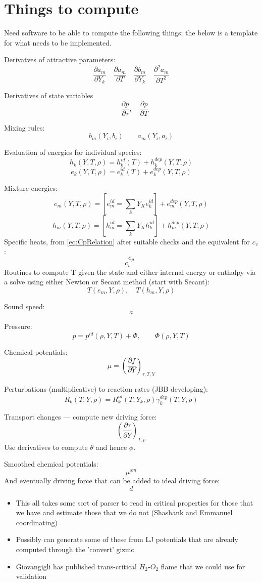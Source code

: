 \documentclass[11pt]{article}
\newcommand{\MarginPar}[1]{\marginpar{%
\vskip-\baselineskip %
\raggedright\tiny\sffamily
\hrule\smallskip{\color{red}#1}\par\smallskip\hrule}}
\begin{document}
\section{Things to compute}
Need software to be able to compute the following things; the below is a template for what needs to be implemented. 

Derivatves of attractive parameters:
\[
\frac{\partial a_m}{\partial Y_k} \quad \frac{\partial a_m}{\partial T} \quad \frac{\partial b_m}{\partial Y_k} \quad \frac{\partial^2 a_m}{\partial T^2}
\]

Derivatives of state variables
\[
\quad \frac{\partial p}{\partial \tau}, \quad \frac{\partial p}{\partial T}
\]

Mixing rules:
\[
b_m(Y_i,b_i) \qquad a_m(Y_i,a_i)
\]

Evaluation of energies for individual species:
\[
h_k(Y, T, \rho) = h_k^{id}(T) + h_k^{dep}(Y,T,\rho)
\]
\[
e_k(Y, T, \rho) = e_k^{id}(T) + e_k^{dep}(Y,T,\rho)
\]

Mixture energies:
\[
e_m(Y, T, \rho) = \left[e_m^{id} = \sum_k Y_Ke_k^{id}\right] + e_m^{dep}(Y,T,\rho)
\]
\[
h_m(Y, T, \rho) = \left[h_m^{id} = \sum_k Y_Kh_k^{id}\right] + h_m^{dep}(Y,T,\rho)
\]
Specific heats, from \ref{eq:CpRelation} after suitable checks and the equivalent for $c_v$:
\[
c_p 
\]
\[
c_v \quad 
\]\MarginPar{check if we really need $c_v$}
Routines to compute T given the state and either internal energy or enthalpy via a solve using either Newton or Secant method (start with Secant):
\[
T(e_m,Y,\rho), \quad T(h_m,Y,\rho)
\]

Sound speed:
\[
a
\]

Pressure:
\[
p = p^{id}(\rho, Y, T) + \Phi,  \qquad \Phi(\rho, Y, T)
\]

Chemical potentials:
\[
\mu = \left(\frac{\partial f}{\partial Y}\right)_{\tau,T,Y}
\]

Perturbations (multiplicative) to reaction rates (JBB developing):
\[
R_k(T,Y,\rho) = R_k^{id}(T,Y_k,\rho)\gamma_k^{dep}(T,Y,\rho)
\]

Transport changes --- compute new driving force:
\[
\left(\frac{\partial \tau}{\partial Y}\right)_{T,p}
\]
Use derivatives to compute $\theta$ and hence $\phi$.

Smoothed chemical potentials:
\[
\mu^{sm}
\]
And eventually driving force that can be added to ideal driving force:
\[
d
\]

\begin{itemize}
    \item This all takes some sort of parser to read in critical properties for those that we have and estimate those that we do not (Shashank and Emmanuel coordinating)
    \item Possibly can generate some of these from LJ potentials that are already computed through the 'convert' gizmo
    \item Giovangigli has published trans-critical $H_2$-$O_2$ flame that we could use for validation 
    
\end{itemize}
\end{document}
